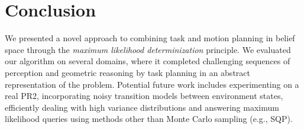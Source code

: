 \section{Conclusion}
We presented a novel approach to combining task and motion planning
in belief space through the \emph{maximum likelihood determinization}
principle. We evaluated our algorithm on several domains, where it completed
challenging sequences of perception and geometric reasoning by task planning in
an abstract representation of the problem. Potential future work includes experimenting on a real PR2, incorporating noisy transition models between environment states, efficiently dealing with high variance distributions and answering maximum likelihood queries using methods other than Monte Carlo sampling (e.g., SQP).